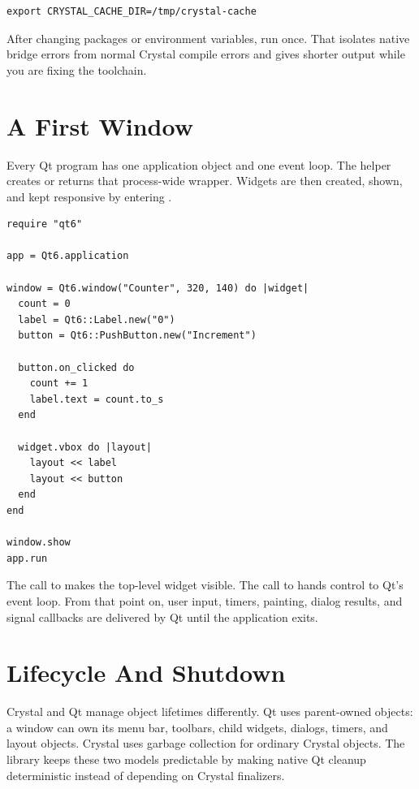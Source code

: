 \begin{lstlisting}[style=crystal]
export CRYSTAL_CACHE_DIR=/tmp/crystal-cache
\end{lstlisting}

After changing packages or environment variables, run  once. That isolates native bridge errors from normal Crystal compile errors and gives shorter output while you are fixing the toolchain.

\section{A First Window}

Every Qt program has one application object and one event loop. The  helper creates or returns that process-wide wrapper. Widgets are then created, shown, and kept responsive by entering .

\begin{lstlisting}[style=crystal]
require "qt6"

app = Qt6.application

window = Qt6.window("Counter", 320, 140) do |widget|
  count = 0
  label = Qt6::Label.new("0")
  button = Qt6::PushButton.new("Increment")

  button.on_clicked do
    count += 1
    label.text = count.to_s
  end

  widget.vbox do |layout|
    layout << label
    layout << button
  end
end

window.show
app.run
\end{lstlisting}

The call to  makes the top-level widget visible. The call to  hands control to Qt's event loop. From that point on, user input, timers, painting, dialog results, and signal callbacks are delivered by Qt until the application exits.

\section{Lifecycle And Shutdown}

Crystal and Qt manage object lifetimes differently. Qt uses parent-owned objects: a window can own its menu bar, toolbars, child widgets, dialogs, timers, and layout objects. Crystal uses garbage collection for ordinary Crystal objects. The  library keeps these two models predictable by making native Qt cleanup deterministic instead of depending on Crystal finalizers.

